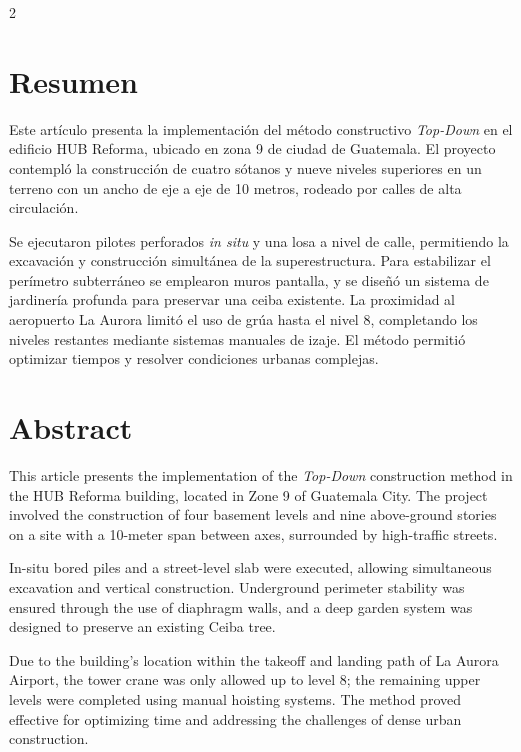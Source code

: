 \documentclass[12pt,spanish,Letterpaper,openany]{book}
\begin{document}
\begin {multicols}{2}

\hypertarget{resumen-1}{%
\section{Resumen}\label{resumen-1}}

Este artículo presenta la implementación del método constructivo \emph{Top-Down} en el edificio HUB Reforma, ubicado en zona 9 de ciudad de Guatemala. El proyecto contempló la construcción de cuatro sótanos y nueve niveles superiores en un terreno con un ancho de eje a eje de 10 metros, rodeado por calles de alta circulación.

Se ejecutaron pilotes perforados \emph{in situ} y una losa a nivel de calle, permitiendo la excavación y construcción simultánea de la superestructura. Para estabilizar el perímetro subterráneo se emplearon muros pantalla, y se diseñó un sistema de jardinería profunda para preservar una ceiba existente. La proximidad al aeropuerto La Aurora limitó el uso de grúa hasta el nivel 8, completando los niveles restantes mediante sistemas manuales de izaje. El método permitió optimizar tiempos y resolver condiciones urbanas complejas.

\hypertarget{abstract-1}{%
\section{Abstract}\label{abstract-1}}

This article presents the implementation of the \emph{Top-Down} construction method in the HUB Reforma building, located in Zone 9 of Guatemala City. The project involved the construction of four basement levels and nine above-ground stories on a site with a 10-meter span between axes, surrounded by high-traffic streets.

In-situ bored piles and a street-level slab were executed, allowing simultaneous excavation and vertical construction. Underground perimeter stability was ensured through the use of diaphragm walls, and a deep garden system was designed to preserve an existing Ceiba tree.

Due to the building's location within the takeoff and landing path of La Aurora Airport, the tower crane was only allowed up to level 8; the remaining upper levels were completed using manual hoisting systems. The method proved effective for optimizing time and addressing the challenges of dense urban construction.


\end{multicols}
\end{document}
